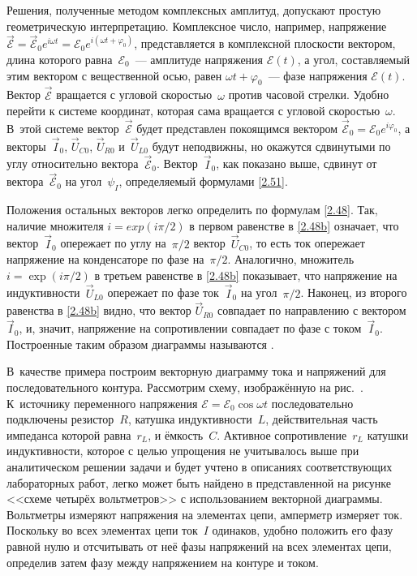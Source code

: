
Решения, полученные методом комплексных амплитуд, допускают простую
геометрическую интерпретацию. Комплексное число, например, напряжение
$\vec{\mathcal{E}}=\vec{\mathcal{E}}_0e^{i\omega t}=\mathcal{E}_0e^{i(\omega
t+\varphi_0)}$, представляется в комплексной плоскости вектором, длина которого
равна~$\mathcal{E}_0$~--- амплитуде напряжения $\mathcal{E}(t)$, а угол,
составляемый этим вектором с вещественной осью, равен $\omega
t+\varphi_0$~--- фазе напряжения $\mathcal{E}(t)$. Вектор $\vec{\mathcal{E}}$
вращается с угловой скоростью~$\omega$ против часовой стрелки. Удобно перейти к
системе координат, которая сама вращается с угловой скоростью~$\omega$. В~этой
системе вектор~$\vec{\mathcal{E}}$ будет представлен покоящимся вектором
$\vec{\mathcal{E}}_0=\mathcal{E}_0e^{i\varphi_0}$, а векторы~$\vec I_0$, $\vec U_{C0}$,
$\vec U_{R0}$ и~$\vec U_{L0}$ будут неподвижны, но окажутся сдвинутыми по углу
относительно вектора~$\vec{\mathcal{E}}_0$. Вектор~$\vec I_0$, как показано выше,
сдвинут от вектора~$\vec{\mathcal{E}}_0$ на угол~$\psi_I$, определяемый формулами
\eqref{2.51}.

Положения остальных векторов легко определить по формулам \eqref{2.48}. Так,
наличие множителя $i=exp(i\pi/2)$ в первом равенстве в \eqref{2.48b} означает,
что вектор~$\vec I_0$ опережает по углу на~$\pi/2$ вектор~$\vec U_{C0}$, то есть
ток опережает напряжение на конденсаторе по фазе на~$\pi/2$. Аналогично,
множитель $i=\exp(i\pi/2)$ в третьем равенстве в \eqref{2.48b} показывает, что
напряжение на индуктивности~$\vec U_{L0}$ опережает по фазе ток~$\vec I_0$ на
угол~$\pi/2$. Наконец, из второго равенства в \eqref{2.48b} видно, что вектор
$\vec U_{R0}$ совпадает по направлению с вектором~$\vec I_0$, и, значит,
напряжение на сопротивлении совпадает по фазе с током~$\vec I_0$. Построенные
таким образом диаграммы называются .

В~качестве примера построим векторную диаграмму тока и напряжений для
последовательного контура. Рассмотрим схему, изображённую на рис.~.
К~источнику переменного напряжения $\mathcal{E}=\mathcal{E}_0\cos\omega t$
последовательно подключены резистор~$R$, катушка индуктивности~$L$,
действительная часть импеданса которой равна~$r_L$, и ёмкость~$C$. Активное
сопротивление~$r_L$ катушки индуктивности, которое с целью упрощения не
учитывалось выше при аналитическом решении задачи и будет учтено в описаниях
соответствующих лабораторных работ, легко может быть найдено в представленной на
рисунке <<схеме четырёх вольтметров>> с использованием векторной диаграммы.
Вольтметры измеряют напряжения на элементах цепи, амперметр измеряет ток.
Поскольку во всех элементах цепи ток~$I$ одинаков, удобно положить его фазу
равной нулю и отсчитывать от неё фазы напряжений на всех элементах цепи,
определив затем фазу   между напряжением на контуре и током.

